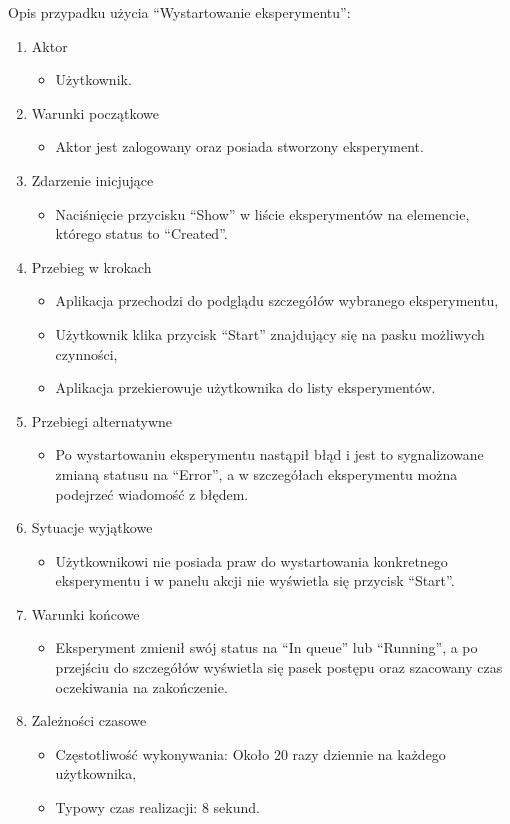 Opis przypadku użycia \enquote{Wystartowanie eksperymentu}:
\begin{enumerate}
	\item  Aktor
	\begin{itemize}
		\item Użytkownik. 
	\end{itemize}
	\item Warunki początkowe
	\begin{itemize}
		\item Aktor jest zalogowany oraz posiada stworzony eksperyment.
	\end{itemize}
	\item Zdarzenie inicjujące
	\begin{itemize}
		\item Naciśnięcie przycisku \enquote{Show} w liście eksperymentów na elemencie, którego status to \enquote{Created}.
	\end{itemize}
	\item Przebieg w krokach
	\begin{itemize}
		\item Aplikacja przechodzi do podglądu szczegółów wybranego eksperymentu,
		\item Użytkownik klika przycisk \enquote{Start} znajdujący się na pasku możliwych czynności,
		\item Aplikacja przekierowuje użytkownika do listy eksperymentów.
	\end{itemize}
	\item Przebiegi alternatywne
	\begin{itemize}
		\item  Po wystartowaniu eksperymentu nastąpił błąd i jest to sygnalizowane zmianą statusu na \enquote{Error}, a w szczegółach eksperymentu można podejrzeć wiadomość z błędem.
	\end{itemize}
	\item Sytuacje wyjątkowe
	\begin{itemize}
		\item  Użytkownikowi nie posiada praw do wystartowania konkretnego eksperymentu i w panelu akcji nie wyświetla się przycisk \enquote{Start}.
	\end{itemize}
	\item Warunki końcowe
	\begin{itemize}
		\item  Eksperyment zmienił swój status na \enquote{In queue} lub \enquote{Running}, a po przejściu do szczegółów wyświetla się pasek postępu oraz szacowany czas oczekiwania na zakończenie.
	\end{itemize}
	\item Zależności czasowe
	\begin{itemize}
		\item Częstotliwość wykonywania: Około 20 razy dziennie na każdego użytkownika,
		\item Typowy czas realizacji: 8 sekund.
	\end{itemize}
\end{enumerate}
\vspace*{\baselineskip}

